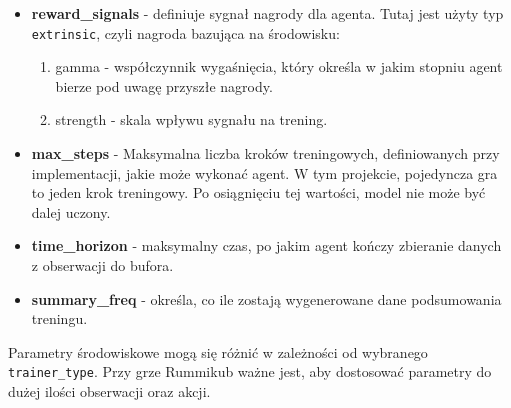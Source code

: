 \documentclass[a4paper,twoside,12pt]{book}
\begin{document}
\begin{itemize}
\begin{enumerate}
				\item hidden\_units - liczba jednostek w każdej warstwie ukrytej sieci neuronowej.
				\item num\_layers - ilość warstw sieci neuronowej.
			\end{enumerate}
			\item \textbf{reward\_signals} - definiuje sygnał nagrody dla agenta. Tutaj jest użyty typ \texttt{extrinsic}, czyli nagroda bazująca na środowisku:
			\begin{enumerate}
				\item gamma - współczynnik wygaśnięcia, który określa w jakim stopniu agent bierze pod uwagę przyszłe nagrody.
				\item strength - skala wpływu sygnału na trening.
			\end{enumerate}
			\item \textbf{max\_steps} - Maksymalna liczba kroków treningowych, definiowanych przy implementacji, jakie może wykonać agent. W tym projekcie, pojedyncza gra to jeden krok treningowy. Po osiągnięciu tej wartości, model nie może być dalej uczony.
			\item \textbf{time\_horizon} - maksymalny czas, po jakim agent kończy zbieranie danych z obserwacji do bufora.
			\item \textbf{summary\_freq} - określa, co ile zostają wygenerowane dane podsumowania treningu.
		\end{itemize}
		
		Parametry środowiskowe mogą się różnić w zależności od wybranego \texttt{trainer\_type}. Przy grze Rummikub ważne jest, aby dostosować parametry do dużej ilości obserwacji oraz akcji.
\end{document}
